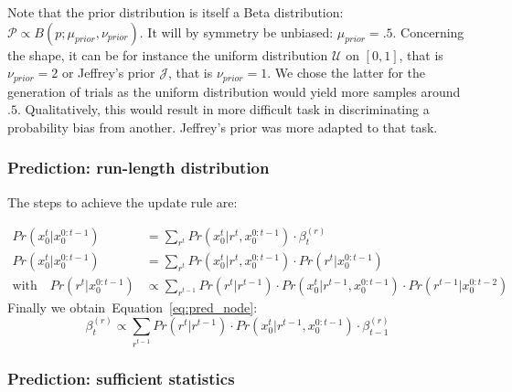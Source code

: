 \documentclass[10pt,letterpaper]{article}
\newcommand{\eq}[1]{\begin{equation*}#1\end{equation*}}
\newcommand{\eqs}[1]{\begin{align*}#1\end{align*}}
\newcommand{\Jj}{\mathcal{J}}
\newcommand{\Pp}{\mathcal{P}}
\newcommand{\Uu}{\mathcal{U}}
\newcommand{\seeEq}[1]{Equation~\ref{eq:#1}}
\begin{document}
%
%

%
%



Note that the prior distribution is itself a Beta distribution:
$\Pp\propto B(p; \mu_{prior}, \nu_{prior})$.
It will by symmetry be unbiased: $\mu_{prior}=.5$.
Concerning the shape, it can be for instance
the uniform distribution $\Uu$ on $ [ 0, 1 ] $, that is $\nu_{prior}=2$ or
Jeffrey's prior $\Jj$, that is $\nu_{prior}=1$.
We chose the latter for the generation of trials
as the uniform distribution would yield more samples around $.5$.
Qualitatively, this would result in more difficult task in discriminating a probability bias from another.
Jeffrey's prior was more adapted to that task.


\subsubsection{Prediction: run-length distribution}

The steps to achieve the update rule are:

 \eqs{
Pr(x_0^t | x_0^{0:t-1}) &= \sum_{r^{t}} Pr(x_0^t | r^{t}, x_0^{0:t-1}) \cdot  \beta^{(r)}_t \\
Pr(x_0^t | x_0^{0:t-1}) &= \sum_{r^{t}} Pr(x_0^t | r^{t}, x_0^{0:t-1}) \cdot  Pr(r^{t} | x_0^{0:t-1})\\
\text{with} \quad Pr(r^{t} | x_0^{0:t-1}) &\propto \sum_{r^{t-1}}  Pr(r^t | r^{t-1}) \cdot  Pr(x_0^t | r^{t-1}, x_0^{0:t-1}) \cdot  Pr(r^{t-1} | x_0^{0:t-2})
}
Finally we obtain~\seeEq{pred_node}:
\eq{
\beta^{(r)}_t \propto \sum_{r^{t-1}}  Pr(r^t | r^{t-1}) \cdot  Pr(x_0^t | r^{t-1}, x_0^{0:t-1}) \cdot  \beta^{(r)}_{t-1}
}


\subsubsection{Prediction: sufficient statistics}
\end{document}
